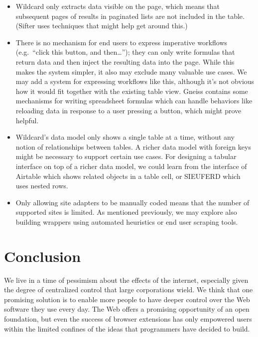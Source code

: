 \documentclass[english,submission]{programming}
\providecommand{\tightlist}{%
  \setlength{\itemsep}{0pt}\setlength{\parskip}{0pt}}
\begin{document}
\begin{itemize}
\tightlist
\item
  Wildcard only extracts data visible on the page, which means that
  subsequent pages of results in paginated lists are not included in the
  table. (Sifter \autocite{huynh2006} uses techniques that might help
  get around this.)
\item
  There is no mechanism for end users to express imperative workflows
  (e.g.~``click this button, and then\ldots{}''); they can only write
  formulas that return data and then inject the resulting data into the
  page. While this makes the system simpler, it also may exclude many
  valuable use cases. We may add a system for expressing workflows like
  this, although it's not obvious how it would fit together with the
  existing table view. Gneiss \autocite{chang2014} contains some
  mechanisms for writing spreadsheet formulas which can handle behaviors
  like reloading data in response to a user pressing a button, which
  might prove helpful.
\item
  Wildcard's data model only shows a single table at a time, without any
  notion of relationships between tables. A richer data model with
  foreign keys might be necessary to support certain use cases. For
  designing a tabular interface on top of a richer data model, we could
  learn from the interface of Airtable which shows related objects in a
  table cell, or SIEUFERD \autocite{bakke2016} which uses nested rows.
\item
  Only allowing site adapters to be manually coded means that the number
  of supported sites is limited. As mentioned previously, we may explore
  also building wrappers using automated heuristics or end user scraping
  tools.
\end{itemize}

\hypertarget{conclusion}{%
\section{Conclusion}\label{conclusion}}

We live in a time of pessimism about the effects of the internet,
especially given the degree of centralized control that large
corporations wield. We think that one promising solution is to enable
more people to have deeper control over the Web software they use every
day. The Web offers a promising opportunity of an open foundation, but
even the success of browser extensions has only empowered users within
the limited confines of the ideas that programmers have decided to
build.
\end{document}
